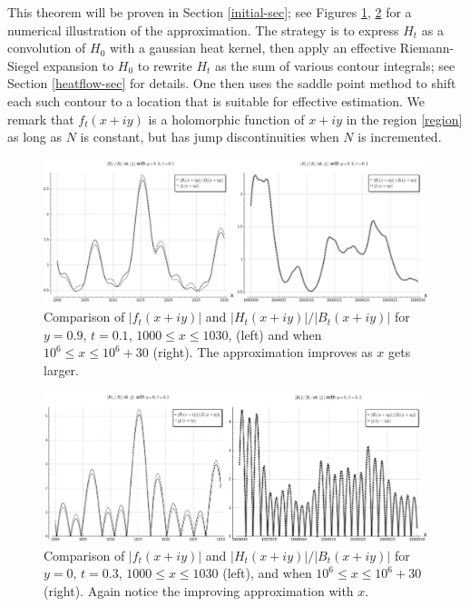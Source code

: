\documentclass[a4paper,11pt,twoside]{amsart}
\begin{document}
This theorem will be proven in Section \ref{initial-sec}; see Figures \ref{htft}, \ref{htft-2} for a numerical illustration of the approximation.  The strategy is to express $H_t$ as a convolution of $H_0$ with a gaussian heat kernel, then apply an effective Riemann-Siegel expansion to $H_0$ to rewrite $H_t$ as the sum of various contour integrals; see Section \ref{heatflow-sec} for details.  One then uses the saddle point method to shift each such contour to a location that is suitable for effective estimation.   We remark that $f_t(x+iy)$ is a holomorphic function of $x+iy$ in the region \eqref{region} as long as $N$ is constant, but has jump discontinuities when $N$ is incremented.

\begin{figure}[ht!]
  \includegraphics[width=\linewidth]{ft_vs_HtdivBt_y_09.png}
  \caption{Comparison of $|f_t(x+iy)|$ and $|H_t(x+iy)|/|B_t(x+iy)|$ for $y=0.9$, $t=0.1$, $1000 \leq x \leq 1030$, (left) and when $10^6 \leq x \leq 10^6 + 30$ (right). The approximation improves as $x$ gets larger.}
	\label{htft}
\end{figure}

\begin{figure}[ht!]
  \includegraphics[width=\linewidth]{ft_vs_HtdivBt_y_0.png}
  \caption{Comparison of $|f_t(x+iy)|$ and $|H_t(x+iy)|/|B_t(x+iy)|$ for $y=0$, $t=0.3$, $1000 \leq x \leq 1030$ (left), and when $10^6 \leq x \leq 10^6 + 30$ (right). Again notice the improving approximation with $x$.}
	\label{htft-2}
\end{figure}
\end{document}
